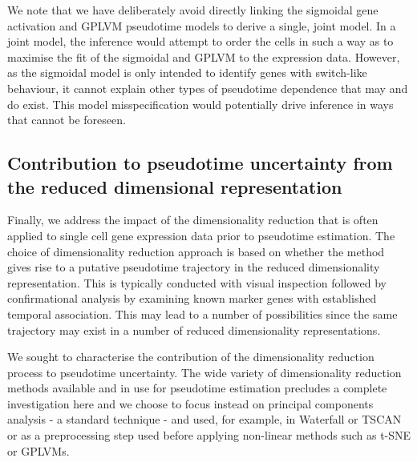 We note that we have deliberately avoid directly linking the sigmoidal gene activation and GPLVM pseudotime models to derive a single, joint model. In a joint model, the inference would attempt to order the cells in such a way as to maximise the fit of the sigmoidal and GPLVM to the expression data. However, as the sigmoidal model is only intended to identify genes with switch-like behaviour, it cannot explain other types of pseudotime dependence that may and do exist. This model misspecification would potentially drive inference in ways that cannot be foreseen.

\subsection{Contribution to pseudotime uncertainty from the reduced dimensional representation}

Finally, we address the impact of the dimensionality reduction that is often applied to single cell gene expression data prior to pseudotime estimation. The choice of dimensionality reduction approach is based on whether the method gives rise to a putative pseudotime trajectory in the reduced dimensionality representation. This is typically conducted with visual inspection followed by confirmational analysis by examining known marker genes with established temporal association. This may lead to a number of possibilities since the same trajectory may exist in a number of reduced dimensionality representations.

We sought to characterise the contribution of the dimensionality reduction process to pseudotime uncertainty. The wide variety of dimensionality reduction methods available and in use for pseudotime estimation precludes a complete investigation here and we choose to focus instead on principal components analysis - a standard technique - and used, for example, in Waterfall \cite{shin2015single} or TSCAN \cite{ji2016tscan} or as a preprocessing step used before applying non-linear methods such as t-SNE or GPLVMs.

